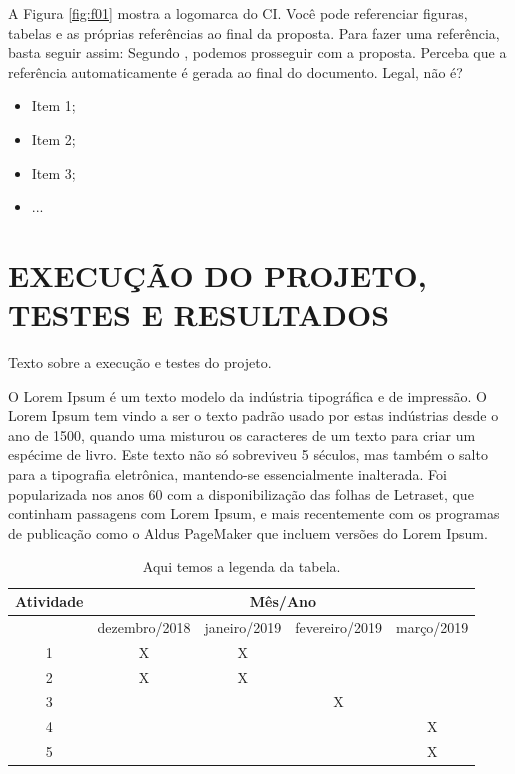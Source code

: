 \documentclass[10pt, a4paper, twocolumn]{article}
\begin{document}
A Figura \ref{fig:f01} mostra a logomarca do CI. Você pode referenciar figuras, tabelas e as próprias referências ao final da proposta.
Para fazer uma referência, basta seguir assim: Segundo \citep{ackerman2007business}, podemos prosseguir com a proposta. Perceba que a referência automaticamente é gerada ao final do documento. Legal, não é?


\begin{itemize}
\item Item 1; 
\item Item 2; 
\item Item 3; 
\item ...
\end{itemize}


\section*{EXECUÇÃO DO PROJETO, TESTES E RESULTADOS}

Texto sobre a execução e testes do projeto. \par

O Lorem Ipsum é um texto modelo da indústria tipográfica e de impressão. O Lorem Ipsum tem vindo a ser o texto padrão usado por estas indústrias desde o ano de 1500, quando uma misturou os caracteres de um texto para criar um espécime de livro. Este texto não só sobreviveu 5 séculos, mas também o salto para a tipografia eletrônica, mantendo-se essencialmente inalterada. Foi popularizada nos anos 60 com a disponibilização das folhas de Letraset, que continham passagens com Lorem Ipsum, e mais recentemente com os programas de publicação como o Aldus PageMaker que incluem versões do Lorem Ipsum.

\begin{table}[h!]
\centering
\scriptsize
\begin{tabular}{|c|c|c|c|c|}
	\hline
    Atividade & \multicolumn{4}{c|}{Mês/Ano} \\
    \hline
    & dezembro/2018 & janeiro/2019 & fevereiro/2019 & março/2019  \\
    \hline
	1 & X & X & &   \\
    \hline
    2 & X & X & &   \\
    \hline
    3 &  &  & X &   \\
    \hline
    4 &  &  & & X   \\
    \hline
    5 &  &  & & X  \\
    \hline
\end{tabular}
\caption{Aqui temos a legenda da tabela.}
\label{tb-cronograma}
\end{table}
\end{document}
